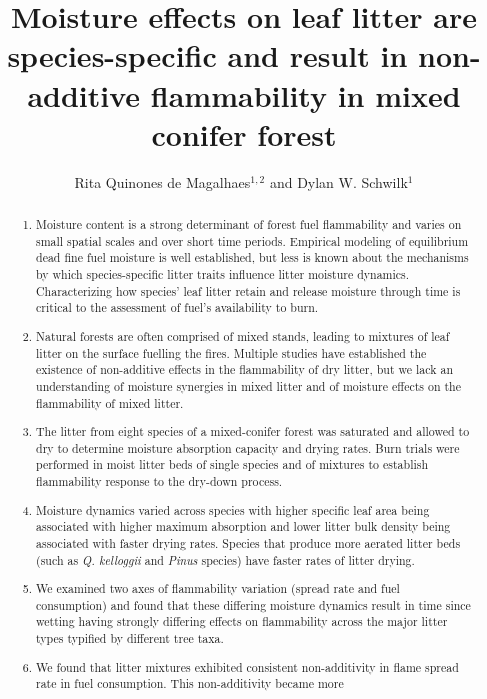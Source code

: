 \documentclass[letterpaper,12pt]{article}
\title{Moisture effects on leaf litter are species-specific and result in non-additive flammability in mixed conifer forest}
\author{Rita Quinones de Magalhaes$^{1,2}$ and Dylan W. Schwilk$^1$}
\begin{document}
\maketitle

\begin{abstract}
  \noindent \begin{enumerate}
    
      \item Moisture content is a strong determinant of forest fuel
    flammability and varies on small spatial scales and over short time
    periods. Empirical modeling of equilibrium dead fine fuel moisture is well
    established, but less is known about the mechanisms by which
    species-specific litter traits influence litter moisture dynamics.
    Characterizing how species’ leaf litter retain and release moisture through
    time is critical to the assessment of fuel’s availability to burn.
      \item Natural forests are often comprised of mixed stands, leading to
    mixtures of leaf litter on the surface fuelling the fires. Multiple studies
    have established the existence of non-additive effects in the flammability
    of dry litter, but we lack an understanding of moisture synergies in mixed
    litter and of moisture effects on the flammability of mixed litter.
      \item The litter from eight species of a mixed-conifer forest was
    saturated and allowed to dry to determine moisture absorption capacity and
    drying rates. Burn trials were performed in moist litter beds of single
    species and of mixtures to establish flammability response to the dry-down
    process.
      \item Moisture dynamics varied across species with higher specific leaf
    area being associated with higher maximum absorption and lower litter bulk
    density being associated with faster drying rates. Species that produce
    more aerated litter beds (such as \emph{Q. kelloggii} and \emph{Pinus}
    species) have faster rates of litter drying.
      \item We examined two axes of flammability variation (spread rate and
    fuel consumption) and found that these differing moisture dynamics result
    in time since wetting having strongly differing effects on flammability
    across the major litter types typified by different tree taxa.
      \item We found that litter mixtures exhibited consistent non-additivity
    in flame spread rate in fuel consumption. This non-additivity became more

\end{enumerate}
\end{abstract}
\end{document}

